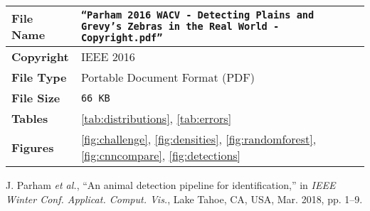 \begin{table*}[!ht]
    \begin{center}
        \begin{tabular}{| l | p{13.5cm} |}
            \hline
            \textbf{File Name} & \texttt{``Parham 2016 WACV - Detecting Plains and Grevy's Zebras in the Real World - Copyright.pdf''}        \\
            \hline
            \textbf{Copyright} & IEEE 2016                                                                                                    \\
            \hline
            \textbf{File Type} & Portable Document Format (PDF)                                                                               \\
            \hline
            \textbf{File Size} & \texttt{66 KB}                                                                                               \\
            \hline
            \textbf{Tables}    & \ref{tab:distributions}, \ref{tab:errors}                                                                    \\
            \hline
            \textbf{Figures}   & \ref{fig:challenge}, \ref{fig:densities}, \ref{fig:randomforest}, \ref{fig:cnncompare}, \ref{fig:detections} \\
            \hline
        \end{tabular}
    \end{center}
\end{table*}

\begin{tcolorbox}
    J. Parham \textit{et al.}, ``An animal detection pipeline for identification,'' in \textit{IEEE Winter Conf. Applicat. Comput. Vis.}, Lake Tahoe, CA, USA, Mar. 2018, pp. 1–9.
\end{tcolorbox}

